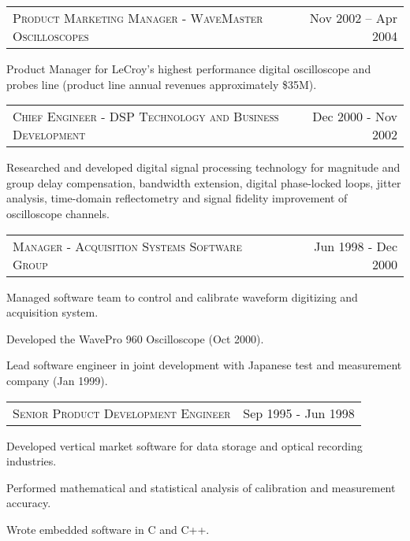 \documentclass[10pt,letterpaper]{extarticle}
\makeatletter
\newcommand{\headerrow}[2]
{\begin{tabular*}{\linewidth}{l@{\extracolsep{\fill}}r}
	#1 &
	#2 \\
\end{tabular*}}
\makeatother
\begin{document}
	\headerrow
	{\large \textsc{Product Marketing Manager - WaveMaster Oscilloscopes}}
	{Nov 2002 – Apr 2004}\vspace{-\topsep}\begin{itemize*}
	\item Product Manager for LeCroy's highest performance digital oscilloscope and probes
	line (product line annual revenues approximately \$35M).
	\end{itemize*}\vspace{-\topsep}
	\headerrow
	{\large \textsc{Chief Engineer - DSP Technology and Business Development}}
	{Dec 2000 - Nov 2002}\vspace{-\topsep}\begin{itemize*}
	\item Researched and developed digital signal processing technology for magnitude 
	and group delay compensation, bandwidth extension, digital phase-locked loops, jitter 
	analysis, time-domain reflectometry and signal fidelity improvement of oscilloscope 
	channels.
	\end{itemize*}\vspace{-\topsep}
	\headerrow
	{\large \textsc{Manager - Acquisition Systems Software Group}}
	{Jun 1998 - Dec 2000}\vspace{-\topsep}\begin{itemize*}
	\item Managed  software team to control and calibrate waveform digitizing and acquisition system.
	\item Developed the WavePro 960 Oscilloscope (Oct 2000).
	\item Lead software engineer in joint development with Japanese test and measurement 
	company (Jan 1999).
	\end{itemize*}\vspace{-\topsep}
	\headerrow
	{\large \textsc{Senior Product Development Engineer}}
	{Sep 1995 - Jun 1998}\vspace{-\topsep}\begin{itemize*}
	\item Developed vertical market software for data storage and optical recording industries.
	\item Performed mathematical and statistical analysis of calibration and measurement accuracy.
	\item Wrote embedded software in C and C++.
	\end{itemize*}\vspace{-\topsep}
\clearpage
\fancyhead[CO,CE]{\LARGE \textcolor[gray]{0.7}{Peter J. Pupalaikis}}
\end{document}
